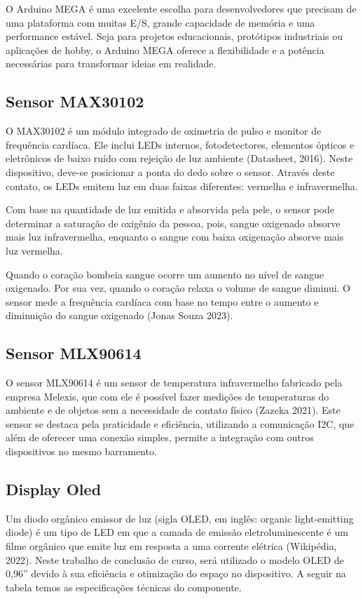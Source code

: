 O Arduino MEGA é uma excelente escolha para desenvolvedores que precisam de uma plataforma com muitas E/S, grande capacidade de memória e uma performance estável. Seja para projetos educacionais, protótipos industriais ou aplicações de hobby, o Arduino MEGA oferece a flexibilidade e a potência necessárias para transformar ideias em realidade.

\subsection{Sensor MAX30102}

O MAX30102 é um módulo integrado de oximetria de pulso e monitor de frequência cardíaca. Ele inclui LEDs internos, fotodetectores, elementos ópticos e eletrônicos de baixo ruído com rejeição de luz ambiente (Datasheet, 2016). Neste dispositivo, deve-se posicionar a ponta do dedo sobre o sensor. Através deste contato, os LEDs emitem luz em duas faixas diferentes: vermelha e infravermelha.

Com base na quantidade de luz emitida e absorvida pela pele, o sensor pode determinar a saturação de oxigênio da pessoa, pois, sangue oxigenado absorve mais luz infravermelha, enquanto o sangue com baixa oxigenação absorve mais luz vermelha.

Quando o coração bombeia sangue ocorre um aumento no nível de sangue oxigenado. Por sua vez, quando o coração relaxa o volume de sangue diminui. O sensor mede a frequência cardíaca com base no tempo entre o aumento e diminuição do sangue oxigenado (Jonas Souza 2023).

\subsection{Sensor MLX90614}

O sensor MLX90614 é um sensor de temperatura infravermelho fabricado pela empresa Melexis, que com ele é possível fazer medições de temperaturas do ambiente e de objetos sem a necessidade de contato físico (Zazeka 2021). Este sensor se destaca pela praticidade e eficiência, utilizando a comunicação I2C, que além de oferecer uma conexão simples, permite a integração com outros dispositivos no mesmo barramento.

\subsection{Display Oled}

Um diodo orgânico emissor de luz (sigla OLED, em inglês: organic light-emitting diode) é um tipo de LED em que a camada de emissão eletroluminescente é um filme orgânico que emite luz em resposta a uma corrente elétrica (Wikipédia, 2022). Neste trabalho de conclusão de curso, será utilizado o modelo OLED de 0,96” devido à sua eficiência e otimização do espaço no dispositivo. A seguir na tabela temos as especificações técnicas do componente.

